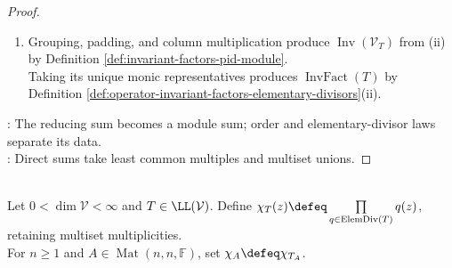 \begin{theorem}
\begin{proof}
\begin{enumerate}[label=(\roman*)]
The identity in (ii) follows by Definition \ref{def:operator-invariant-factors-elementary-divisors}(iii) after taking monic representatives.
\item Grouping, padding, and column multiplication produce $\operatorname{Inv}(\mathcal{V}_T)$ from (ii) by Definition \ref{def:invariant-factors-pid-module}.\\
Taking its unique monic representatives produces $\operatorname{InvFact}(T)$ by Definition \ref{def:operator-invariant-factors-elementary-divisors}(ii).
\end{enumerate}
: The reducing sum becomes a module sum; order and elementary-divisor laws separate its data.\\
: Direct sums take least common multiples and multiset unions.
\end{proof}
\end{theorem}

\begin{definition} \label{def:characteristic-polynomial-from-elementary-divisors} \\
Let $0<\dim\mathcal{V}<\infty$ and $T\in\LL(\mathcal{V})$. Define $\chi_T(z)\defeq\prod\limits_{q\in\operatorname{ElemDiv}(T)}q(z)$, retaining multiset multiplicities.\\
For $n\geq1$ and $A\in\operatorname{Mat}(n,n,\mathbb{F})$, set $\chi_A\defeq\chi_{T_A}$.
\end{definition}

